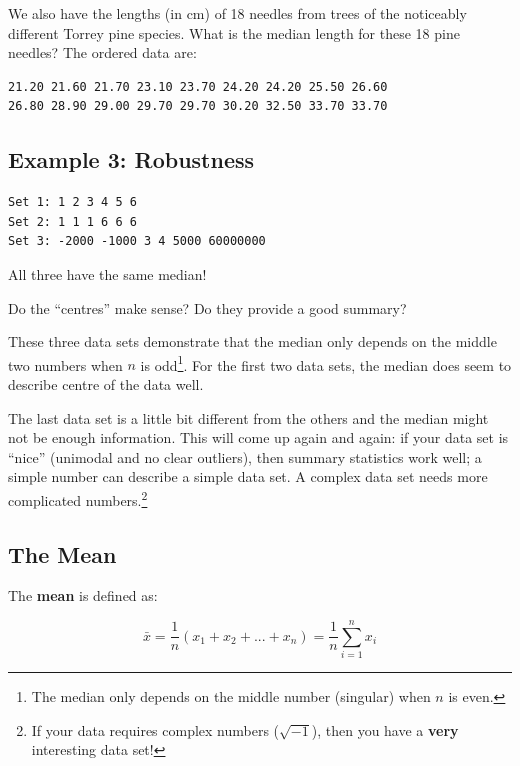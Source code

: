 \documentclass[
  letterpaper,
  DIV=11,
  numbers=noendperiod,
  oneside]{scrreprt}
\begin{document}
We also have the lengths (in cm) of 18 needles from trees of the
noticeably different Torrey pine species. What is the median length for
these 18 pine needles? The ordered data are:

\begin{verbatim}
21.20 21.60 21.70 23.10 23.70 24.20 24.20 25.50 26.60
26.80 28.90 29.00 29.70 29.70 30.20 32.50 33.70 33.70
\end{verbatim}

\hypertarget{example-3-robustness}{%
\subsection{Example 3: Robustness}\label{example-3-robustness}}

\begin{verbatim}
Set 1: 1 2 3 4 5 6
Set 2: 1 1 1 6 6 6
Set 3: -2000 -1000 3 4 5000 60000000
\end{verbatim}

All three have the same median!

Do the ``centres'' make sense? Do they provide a good summary?

These three data sets demonstrate that the median only depends on the
middle two numbers when \(n\) is odd\footnote{The median only depends on
  the middle number (singular) when \(n\) is even.}. For the first two
data sets, the median does seem to describe centre of the data well.

The last data set is a little bit different from the others and the
median might not be enough information. This will come up again and
again: if your data set is ``nice'' (unimodal and no clear outliers),
then summary statistics work well; a simple number can describe a simple
data set. A complex data set needs more complicated numbers.\footnote{If
  your data requires complex numbers (\(\sqrt{-1}\)), then you have a
  \textbf{very} interesting data set!}

\hypertarget{the-mean}{%
\subsection{The Mean}\label{the-mean}}

The \textbf{mean} is defined
as:{}

\[
\bar x = \frac{1}{n}(x_1 + x_2 + ... + x_n)= \frac{1}{n}\sum_{i=1}^nx_i
\]
\end{document}
